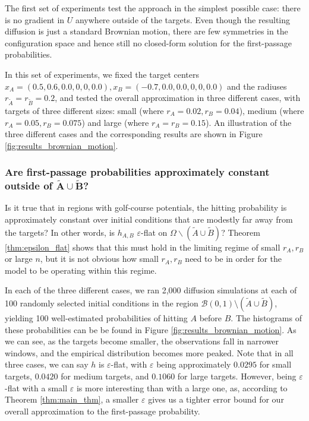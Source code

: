 \documentclass[12pt, nofootinbib,english, amsmath, amssymb, aps, priprint, graphicx,floatfix]{revtex4-1}
\theoremstyle{plain}
\theoremstyle{definition}
\theoremstyle{plain}
\newcommand{\tA}{{\tilde A}}
\newcommand{\tB}{{\tilde B}}
\begin{document}
The first set of experiments test the approach in the simplest possible case: there is no gradient in $U$ anywhere outside of the targets. Even though the resulting diffusion is just a standard Brownian motion, there are few symmetries in the configuration space and hence still no closed-form solution for the first-passage probabilities.

In this set of experiments, we fixed the target centers $x_A=(0.5,0.6,0.0,0,0,0.0), x_B=(-0.7,0.0,0.0,0,0,0.0)$ and the radiuses $r_\tA=r_\tB=0.2$, and tested the overall approximation in three different cases, with targets of three different sizes: small (where $r_A=0.02, r_B=0.04$), medium (where $r_A=0.05, r_B=0.075$) and large (where $r_A=r_B=0.15$). An illustration of the three different cases and the corresponding results are shown in Figure \ref{fig:results_brownian_motion}.

\subsubsection{Are first-passage probabilities approximately constant outside of $\bm{\tA\cup\tB}$?}
\label{sec:toy_constant}
Is it true that in regions with golf-course potentials, the hitting probability is approximately constant over initial conditions that are modestly far away from the targets? In other words, is $h_{A,B}$  $\varepsilon$-flat on $\Omega\backslash(\tA\cup\tB)$?  Theorem \ref{thm:epsilon_flat} shows that this must hold in the limiting regime of small $r_A,r_B$ or large $n$, but it is not obvious how small $r_A, r_B$ need to be in order for the model to be operating within this regime.  

In each of the three different cases, we ran 2,000 diffusion simulations at each of 100 randomly selected initial conditions in the region $\mathcal{B}(0, 1) \setminus (\tilde{A} \cup \tilde{B})$, yielding 100 well-estimated probabilities of hitting $A$ before $B$. The histograms of these probabilities can be be found in Figure \ref{fig:results_brownian_motion}. As we can see, as the targets become smaller, the observations fall in narrower windows, and the empirical distribution becomes more peaked. Note that in all three cases, we can say $h$ is $\varepsilon$-flat, with $\varepsilon$ being approximately $0.0295$ for small targets, $0.0420$ for medium targets, and $0.1060$ for large targets. However, being $\varepsilon$-flat with a small $\varepsilon$ is more interesting than with a large one, as, according to Theorem \ref{thm:main_thm}, a smaller $\varepsilon$ gives us a tighter error bound for our overall approximation to the first-passage probability.
\end{document}
